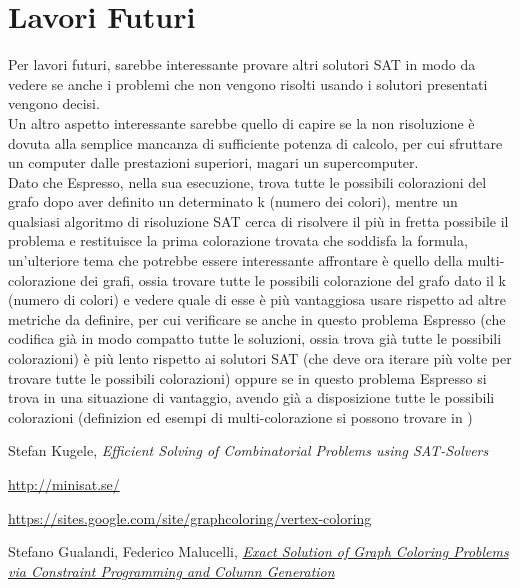 \documentclass[a4paper,11pt]{article} %
\begin{document}
\section{Lavori Futuri}
Per lavori futuri, sarebbe interessante provare altri solutori SAT in modo da vedere se anche i problemi che non vengono risolti usando i solutori presentati vengono decisi.\\
Un altro aspetto interessante sarebbe quello di capire se la non risoluzione è dovuta alla semplice mancanza di sufficiente potenza di calcolo, per cui sfruttare un computer dalle prestazioni superiori, magari un supercomputer.\\
Dato che Espresso, nella sua esecuzione, trova tutte le possibili colorazioni del grafo dopo aver definito un determinato k (numero dei colori), mentre un qualsiasi algoritmo di risoluzione SAT cerca di risolvere il più in fretta possibile il problema e restituisce la prima colorazione trovata che soddisfa la formula, un'ulteriore tema che potrebbe essere interessante affrontare è quello della multi-colorazione dei grafi, ossia trovare tutte le possibili colorazione del grafo dato il k (numero di colori) e vedere quale di esse è più vantaggiosa usare rispetto ad altre metriche da definire, per cui verificare se anche in questo problema Espresso (che codifica già in modo compatto tutte le soluzioni, ossia trova già tutte le possibili colorazioni) è più lento rispetto ai solutori SAT (che deve ora iterare più volte per trovare tutte le possibili colorazioni) oppure se in questo problema Espresso si trova in una situazione di vantaggio, avendo già a disposizione tutte le possibili colorazioni (definizion ed esempi di multi-colorazione si possono trovare in \cite{tesi2})


\pagebreak

\begin{thebibliography}{9}
	 Stefan Kugele,  
	\emph{Efficient Solving of Combinatorial Problems using SAT-Solvers}
	
	 \href{http://minisat.se/}{http://minisat.se/}
	
	 \href{https://sites.google.com/site/graphcoloring/vertex-coloring}{https://sites.google.com/site/graphcoloring/vertex-coloring}
	
	 Stefano Gualandi, Federico Malucelli,  \href{http://www.optimization-online.org/DB_FILE/2010/03/2568.pdf}{\emph{Exact Solution of Graph Coloring Problems via Constraint Programming and Column Generation}}
\end{thebibliography}
\end{document}
